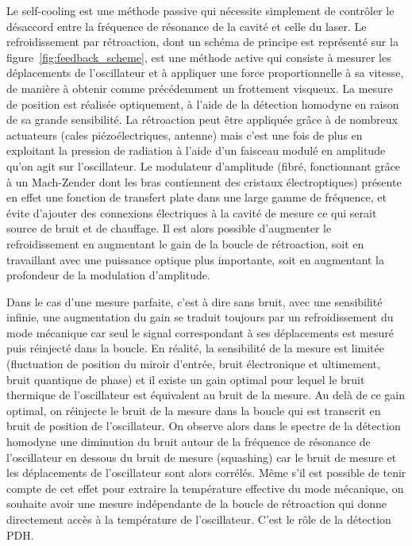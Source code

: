 \documentclass[12pt,a4paper]{article}
\begin{document}
Le self-cooling est une méthode passive qui nécessite \og simplement \fg de contrôler le désaccord entre la fréquence de résonance de la cavité et celle du laser.
Le refroidissement par rétroaction, dont un schéma de principe est représenté sur la figure~\ref{fig:feedback_scheme}, est une méthode active qui consiste à mesurer les déplacements de l'oscillateur et à appliquer une force proportionnelle à sa vitesse, de manière à obtenir comme précédemment un frottement visqueux.
La mesure de position est réalisée optiquement, à l'aide de la détection homodyne en raison de sa grande sensibilité.
La rétroaction peut être appliquée grâce à de nombreux actuateurs (cales piézoélectriques, antenne) mais c'est une fois de plus en exploitant la pression de radiation à l'aide d'un faisceau modulé en amplitude qu'on agit sur l'oscillateur.
Le modulateur d'amplitude (fibré, fonctionnant grâce à un Mach-Zender dont les bras contiennent des cristaux électroptiques) présente en effet une fonction de transfert plate dans une large gamme de fréquence, et évite d'ajouter des connexions électriques à la cavité de mesure ce qui serait source de bruit et de chauffage.
Il est alors possible d'augmenter le refroidissement en augmentant le gain de la boucle de rétroaction, soit en travaillant avec une puissance optique plus importante, soit en augmentant la profondeur de la modulation d'amplitude.

Dans le cas d'une mesure parfaite, c'est à dire sans bruit, avec une sensibilité infinie, une augmentation du gain se traduit toujours par un refroidissement du mode mécanique car seul le signal correspondant à ses déplacements est mesuré puis réinjecté dans la boucle.
En réalité, la sensibilité de la mesure est limitée (fluctuation de position du miroir d'entrée, bruit électronique et ultimement, bruit quantique de phase) et il existe un gain optimal pour lequel le bruit thermique de l'oscillateur est équivalent au bruit de la mesure.
Au delà de ce gain optimal, on réinjecte le bruit de la mesure dans la boucle qui est transcrit en bruit de position de l'oscillateur.
On observe alors dans le spectre de la détection homodyne une diminution du bruit autour de la fréquence de résonance de l'oscillateur en dessous du bruit de mesure (squashing) car le bruit de mesure et les déplacements de l'oscillateur sont alors corrélés.
Même s'il est possible de tenir compte de cet effet pour extraire la température effective du mode mécanique, on souhaite avoir une mesure indépendante de la boucle de rétroaction qui donne directement accès à la température de l'oscillateur.
C'est le rôle de la détection PDH.
\end{document}
